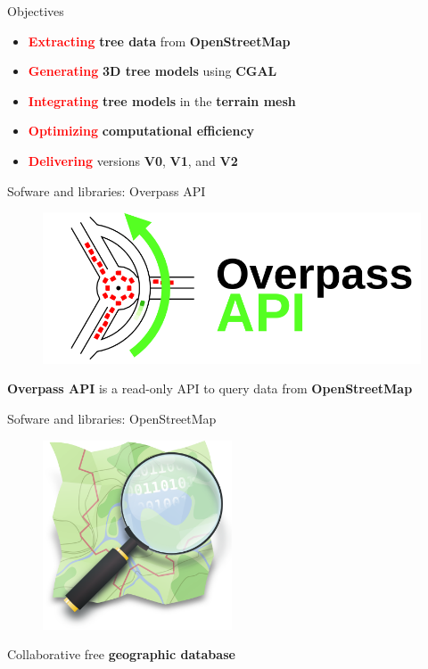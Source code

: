 \documentclass[10pt]{beamer}
\begin{document}
\begin{frame}{Objectives}
  \Large
  \begin{itemize}
      \item \textbf{\textcolor{red}{Extracting}} \textbf{tree data} from \textbf{OpenStreetMap}
      \item \textbf{\textcolor{red}{Generating}} \textbf{3D tree models} using \textbf{CGAL}
      \item \textbf{\textcolor{red}{Integrating}} \textbf{tree models} in the \textbf{terrain mesh}
      \item \textbf{\textcolor{red}{Optimizing}} \textbf{computational efficiency}
      \item \textbf{\textcolor{red}{Delivering}} versions \textbf{V0}, \textbf{V1}, and \textbf{V2}
  \end{itemize}
\end{frame}

\begin{frame}{Sofware and libraries: Overpass API}
  \Large
  \begin{figure}[H]
      \centering
      \includegraphics[width=\textwidth]{images/OvAPI_logo.png}
  \end{figure}
  \begin{center}
  \Large \textbf{Overpass API} is a read-only API to query data from \textbf{OpenStreetMap}
  \end{center}
\end{frame}

\begin{frame}{Sofware and libraries: OpenStreetMap}
  \Large
  \begin{figure}[H]
      \centering
      \includegraphics[width=0.5\textwidth]{images/osm_logo.png}
  \end{figure}
  \begin{center}
    \Large Collaborative free \textbf{geographic database}
  \end{center}
\end{frame}
\end{document}
